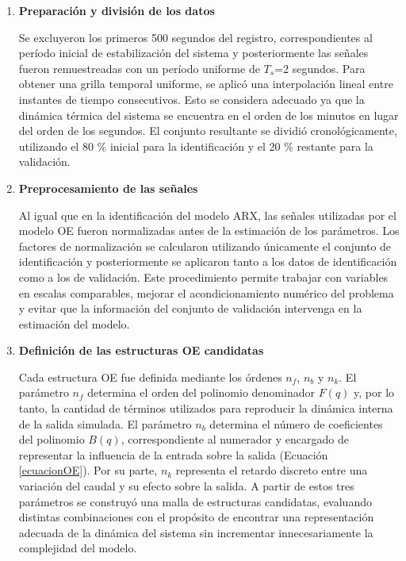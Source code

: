 \documentclass[11pt]{report}
\begin{document}
\begin{enumerate}
    \item \textbf{Preparación y división de los datos}

    Se excluyeron los primeros 500 segundos del registro, correspondientes al período inicial de estabilización del sistema y posteriormente las señales fueron remuestreadas con un período uniforme de $T_s$=2 segundos. Para obtener una grilla temporal uniforme, se aplicó una interpolación lineal entre instantes de tiempo consecutivos. Esto se considera adecuado ya que la dinámica térmica del sistema se encuentra en el orden de los minutos en lugar del orden de los segundos. El conjunto resultante se dividió cronológicamente, utilizando el 80 \% inicial para la identificación y el 20 \% restante para la validación.

    \item \textbf{Preprocesamiento de las señales}

Al igual que en la identificación del modelo ARX, las señales utilizadas por el modelo OE fueron normalizadas antes de la estimación de los parámetros. Los factores de normalización se calcularon utilizando únicamente el conjunto de identificación y posteriormente se aplicaron tanto a los datos de identificación como a los de validación. Este procedimiento permite trabajar con variables en escalas comparables, mejorar el acondicionamiento numérico del problema y evitar que la información del conjunto de validación intervenga en la estimación del modelo.

    \item \textbf{Definición de las estructuras OE candidatas}




    Cada estructura OE fue definida mediante los órdenes $n_f$, $n_b$ y $n_k$. El parámetro $n_f$ determina el orden del polinomio denominador $F(q)$ y, por lo tanto, la cantidad de términos utilizados para reproducir la dinámica interna de la salida simulada. El parámetro $n_b$ determina el número de coeficientes del polinomio $B(q)$, correspondiente al numerador y encargado de representar la influencia de la entrada sobre la salida (Ecuación \ref{ecuacionOE}). Por su parte, $n_k$ representa el retardo discreto entre una variación del caudal y su efecto sobre la salida. A partir de estos tres parámetros se construyó una malla de estructuras candidatas, evaluando distintas combinaciones con el propósito de encontrar una representación adecuada de la dinámica del sistema sin incrementar innecesariamente la complejidad del modelo.


\end{enumerate}
\end{document}
